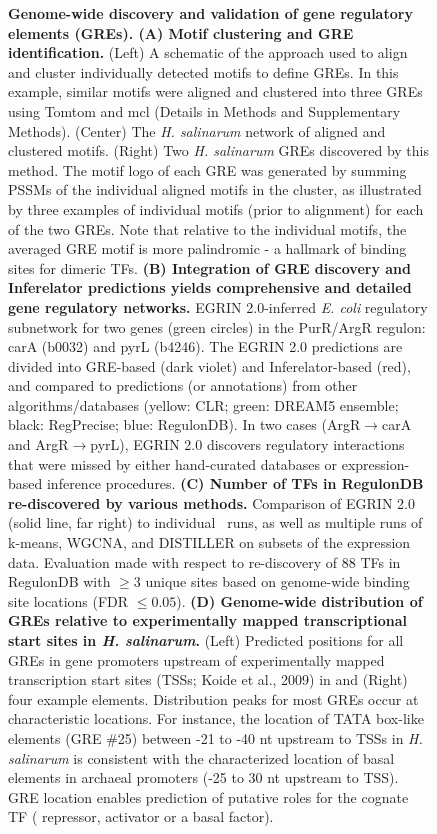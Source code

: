 \begin{figure}[!b]
\centering
{}
\caption{{\bf Genome-wide discovery and validation of gene
regulatory elements (GREs). (A) Motif clustering and GRE
identification.} (Left) A schematic of the approach used to align and
cluster individually detected motifs to define GREs. In this example,
similar motifs were aligned and clustered into three GREs using Tomtom
and mcl (Details in Methods and Supplementary Methods). (Center) The
{\it H. salinarum} network of aligned and clustered motifs. (Right)
Two {\it H. salinarum} GREs discovered by this method. The motif logo
of each GRE was generated by summing PSSMs of the individual aligned
motifs in the cluster, as illustrated by three examples of individual
motifs (prior to alignment) for each of the two GREs. Note that
relative to the individual motifs, the averaged GRE motif is more
palindromic - a hallmark of binding sites for dimeric TFs. {\bf (B)
Integration of GRE discovery and Inferelator predictions yields
comprehensive and detailed gene regulatory networks.} EGRIN
2.0-inferred {\it E. coli} regulatory subnetwork for two genes (green
circles) in the PurR/ArgR regulon: carA (b0032) and pyrL (b4246).  The
EGRIN 2.0 predictions are divided into GRE-based (dark violet) and
Inferelator-based (red), and compared to predictions (or annotations)
from other algorithms/databases (yellow: CLR; green: DREAM5 ensemble;
black: RegPrecise; blue: RegulonDB). In two cases
(ArgR$\rightarrow$carA and ArgR$\rightarrow$pyrL), EGRIN 2.0 discovers
regulatory interactions that were missed by either hand-curated
databases or expression-based inference procedures. {\bf (C) Number of TFs
in RegulonDB re-discovered by various methods.} Comparison of EGRIN 2.0
(solid line, far right) to individual \cm\ runs, as well as
multiple runs of k-means, WGCNA, and DISTILLER on subsets of the
expression data. Evaluation made with respect to re-discovery of 88
TFs in RegulonDB with $\geq 3$ unique sites based on genome-wide
binding site locations (FDR $\leq 0.05$). {\bf (D) Genome-wide
distribution of GREs relative to experimentally mapped transcriptional
start sites in {\it H. salinarum}.} (Left) Predicted positions for all GREs
in gene promoters upstream of experimentally mapped transcription
start sites (TSSs; Koide et al., 2009) in and (Right) four example
elements. Distribution peaks for most GREs occur at characteristic
locations. For instance, the location of TATA box-like elements
(GRE \#25) between -21 to -40 nt upstream to TSSs in {\it H. salinarum} is
consistent with the characterized location of basal elements in
archaeal promoters (-25 to 30 nt upstream to TSS). GRE location
enables prediction of putative roles for the cognate TF (\eg
repressor, activator or a basal factor).}
\label{fig:motclust}
\vspace{-.1in}
\end{figure}

